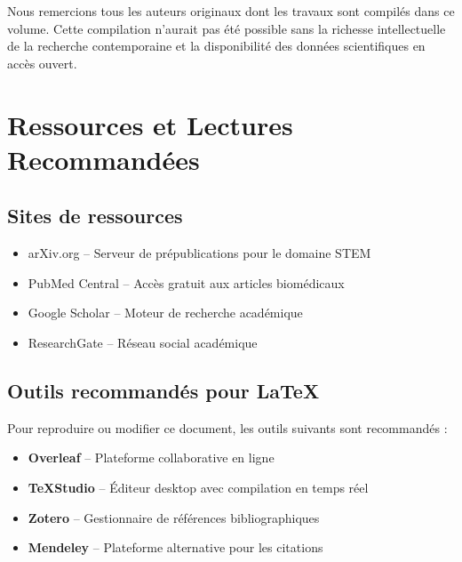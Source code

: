 \documentclass[12pt,a4paper,twoside,openright,openany]{book}
\begin{document}
	Nous remercions tous les auteurs originaux dont les travaux sont compilés dans ce volume. Cette compilation n'aurait pas été possible sans la richesse intellectuelle de la recherche contemporaine et la disponibilité des données scientifiques en accès ouvert.
	
	\newpage
	
	\appendix
	
	\chapter{Ressources et Lectures Recommandées}
	
	\section{Sites de ressources}
	
	\begin{itemize}
		\item arXiv.org -- Serveur de prépublications pour le domaine STEM
		\item PubMed Central -- Accès gratuit aux articles biomédicaux
		\item Google Scholar -- Moteur de recherche académique
		\item ResearchGate -- Réseau social académique
	\end{itemize}
	
	\section{Outils recommandés pour LaTeX}
	
	Pour reproduire ou modifier ce document, les outils suivants sont recommandés :
	
	\begin{itemize}
		\item \textbf{Overleaf} -- Plateforme collaborative en ligne
		\item \textbf{TeXStudio} -- Éditeur desktop avec compilation en temps réel
		\item \textbf{Zotero} -- Gestionnaire de références bibliographiques
		\item \textbf{Mendeley} -- Plateforme alternative pour les citations
	\end{itemize}
	
	\newpage
	
\end{document}

